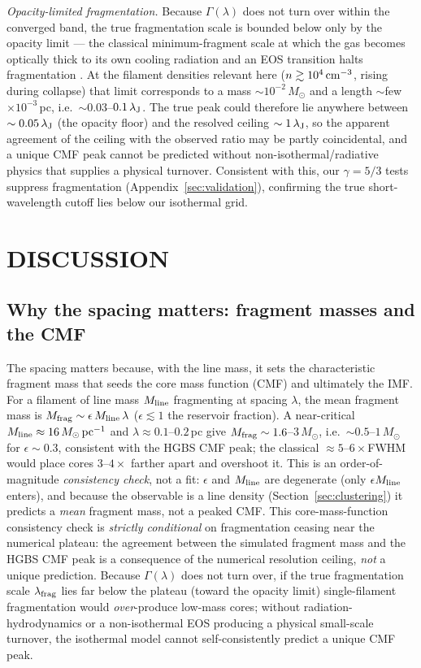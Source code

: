 \documentclass[usenatbib,twoside,twocolumn]{mnras}
\begin{document}
\emph{Opacity-limited fragmentation.} Because $\Gamma(\lambda)$ does not turn over within the converged band, the true fragmentation scale is bounded below only by the opacity limit --- the classical minimum-fragment scale at which the gas becomes optically thick to its own cooling radiation and an EOS transition halts fragmentation \citep{Rees1976,LowLyndenBell1976}. At the filament densities relevant here ($n\gtrsim10^4\,{\rm cm^{-3}}$, rising during collapse) that limit corresponds to a mass $\sim10^{-2}\,M_\odot$ and a length $\sim$few$\times10^{-3}$\,pc, i.e.\ $\sim0.03$--$0.1\,\lambda_{\rm J}$. The true peak could therefore lie anywhere between $\sim0.05\,\lambda_{\rm J}$ (the opacity floor) and the resolved ceiling $\sim1\,\lambda_{\rm J}$, so the apparent agreement of the ceiling with the observed ratio may be partly coincidental, and a unique CMF peak cannot be predicted without non-isothermal/radiative physics that supplies a physical turnover. Consistent with this, our $\gamma=5/3$ tests suppress fragmentation (Appendix~\ref{sec:validation}), confirming the true short-wavelength cutoff lies below our isothermal grid.

\section{DISCUSSION}
\label{sec:discussion}

\subsection{Why the spacing matters: fragment masses and the CMF}
\label{sec:cmf}
The spacing matters because, with the line mass, it sets the characteristic fragment mass that seeds the core mass function (CMF) and ultimately the IMF. For a filament of line mass $M_{\rm line}$ fragmenting at spacing $\lambda$, the mean fragment mass is $M_{\rm frag}\sim\epsilon\,M_{\rm line}\,\lambda$ ($\epsilon\lesssim1$ the reservoir fraction). A near-critical $M_{\rm line}\approx16\,M_\odot\,{\rm pc^{-1}}$ and $\lambda\approx0.1$--$0.2$\,pc give $M_{\rm frag}\sim1.6$--$3\,M_\odot$, i.e.\ $\sim0.5$--$1\,M_\odot$ for $\epsilon\sim0.3$, consistent with the HGBS CMF peak; the classical $\approx5$--$6\times$FWHM would place cores $3$--$4\times$ farther apart and overshoot it. This is an order-of-magnitude \emph{consistency check}, not a fit: $\epsilon$ and $M_{\rm line}$ are degenerate (only $\epsilon M_{\rm line}$ enters), and because the observable is a line density (Section~\ref{sec:clustering}) it predicts a \emph{mean} fragment mass, not a peaked CMF. This core-mass-function consistency check is \emph{strictly conditional} on fragmentation ceasing near the numerical plateau: the agreement between the simulated fragment mass and the HGBS CMF peak is a consequence of the numerical resolution ceiling, \emph{not} a unique prediction. Because $\Gamma(\lambda)$ does not turn over, if the true fragmentation scale $\lambda_{\rm frag}$ lies far below the plateau (toward the opacity limit) single-filament fragmentation would \emph{over}-produce low-mass cores; without radiation-hydrodynamics or a non-isothermal EOS producing a physical small-scale turnover, the isothermal model cannot self-consistently predict a unique CMF peak.
\end{document}

